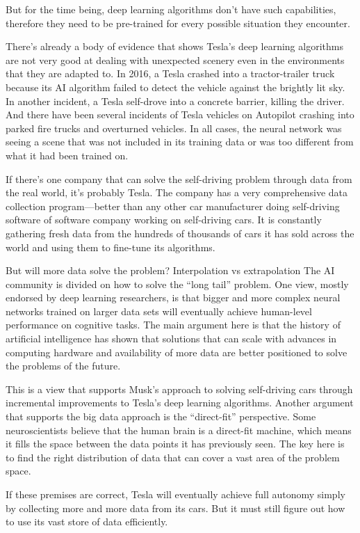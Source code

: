 But for the time being, deep learning algorithms don’t have such capabilities, therefore they need to be pre-trained for every possible situation they encounter.

There’s already a body of evidence that shows Tesla’s deep learning algorithms are not very good at dealing with unexpected scenery even in the environments that they are adapted to. In 2016, a Tesla crashed into a tractor-trailer truck because its AI algorithm failed to detect the vehicle against the brightly lit sky. In another incident, a Tesla self-drove into a concrete barrier, killing the driver. And there have been several incidents of Tesla vehicles on Autopilot crashing into parked fire trucks and overturned vehicles. In all cases, the neural network was seeing a scene that was not included in its training data or was too different from what it had been trained on.

If there’s one company that can solve the self-driving problem through data from the real world, it’s probably Tesla. The company has a very comprehensive data collection program—better than any other car manufacturer doing self-driving software of software company working on self-driving cars. It is constantly gathering fresh data from the hundreds of thousands of cars it has sold across the world and using them to fine-tune its algorithms.

But will more data solve the problem?
Interpolation vs extrapolation
The AI community is divided on how to solve the “long tail” problem. One view, mostly endorsed by deep learning researchers, is that bigger and more complex neural networks trained on larger data sets will eventually achieve human-level performance on cognitive tasks. The main argument here is that the history of artificial intelligence has shown that solutions that can scale with advances in computing hardware and availability of more data are better positioned to solve the problems of the future.

This is a view that supports Musk’s approach to solving self-driving cars through incremental improvements to Tesla’s deep learning algorithms. Another argument that supports the big data approach is the “direct-fit” perspective. Some neuroscientists believe that the human brain is a direct-fit machine, which means it fills the space between the data points it has previously seen. The key here is to find the right distribution of data that can cover a vast area of the problem space.

If these premises are correct, Tesla will eventually achieve full autonomy simply by collecting more and more data from its cars. But it must still figure out how to use its vast store of data efficiently.


